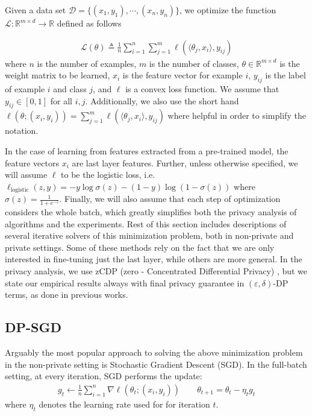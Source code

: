 \documentclass[letterpaper]{article} \usepackage{fullpage}
\def\cD{\mathcal{D}}
\def\calL{\mathcal{L}}
\renewcommand{\epsilon}{\varepsilon}
\begin{document}
Given a data set $\cD=\{(x_1, y_1),\cdots,(x_n, y_n)\}$, we optimize the function $\calL:\mathbb{R}^{m \times d}\to\mathbb{R}$ defined as follows


\begin{align}
    \calL(\theta) \triangleq \frac{1}{n} \sum_{i = 1}^n \sum_{j = 1}^m \ell(\langle \theta_j, x_i\rangle ,y_{ij})
\end{align}
where $n$ is the number of examples, $m$ is the number of classes, $\theta \in \mathbb{R}^{m \times d}$ is the weight matrix to be learned, $x_i$ is the feature vector for example $i$, $y_{ij}$ is the label of example $i$ and class $j$, and $\ell$ is a convex loss function. We assume that $y_{ij} \in [0, 1]$ for all $i,j$. Additionally, we also use the short hand $\ell( \theta;(x_i, y_i)) = \sum_{j = 1}^m \ell(\langle \theta_j, x_i\rangle ,y_{ij})$  where helpful in order to simplify the notation.

In the case of learning from features extracted from a pre-trained model, the feature vectors $x_i$ are last layer features. Further, unless otherwise specified, we will assume $\ell$ to be the logistic loss, i.e. $\ell_{\text{logistic}}(z, y) = - y \log \sigma(z) - (1-y) \log (1-\sigma(z))$ where $\sigma(z) = \frac{1}{1+e^{-z}}$. Finally, we will also assume that each step of optimization considers the whole batch, which greatly simplifies both the privacy analysis of algorithms and the experiments. Rest of this section includes descriptions of several iterative solvers of this minimization problem, both in non-private and private settings. Some of these methods rely on the fact that we are only interested in fine-tuning just the last layer, while others are more general. In the privacy analysis, we use zCDP (zero - Concentrated Differential Privacy) \cite{bun2016concentrated}, but we state our empirical results always with final privacy guarantee in $(\epsilon, \delta)$-DP terms, as done in previous works. 


\subsection{DP-SGD}
Arguably the most popular approach to solving the above minimization problem in the non-private setting is Stochastic Gradient Descent (SGD).
In the full-batch setting, at every iteration, SGD performs the update:
\begin{align}
    g_t \leftarrow \frac{1}{n}\sum_{i=1}^n\nabla\ell( \theta_t;(x_i, y_i)) \qquad
    \theta_{t+1} = \theta_t - \eta_t g_t
\end{align}
where $\eta_t$ denotes the learning rate used for for iteration $t$.
\end{document}
